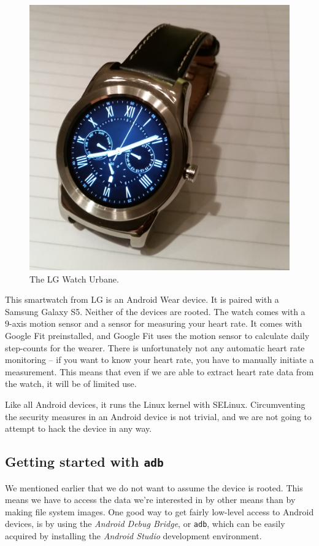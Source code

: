 \documentclass[a4paper,11pt,dvips]{article}
\begin{document}
\begin{figure}
\begin{center}
\includegraphics[natwidth=1000bp,natheight=1019bp,width=0.8\linewidth]{urbane}
\end{center}
\caption{The LG Watch Urbane.}
\label{fig:urbane}
\end{figure}

This smartwatch from LG is an Android Wear device. It is paired with a Samsung Galaxy S5. Neither of the devices are rooted. The watch comes with a 9-axis motion sensor and a sensor for measuring your heart rate. It comes with Google Fit preinstalled, and Google Fit uses the motion sensor to calculate daily step-counts for the wearer. There is unfortunately not any automatic heart rate monitoring -- if you want to know your heart rate, you have to manually initiate a measurement. This means that even if we are able to extract heart rate data from the watch, it will be of limited use.

Like all Android devices, it runs the Linux kernel with SELinux. Circumventing the security measures in an Android device is not trivial, and we are not going to attempt to hack the device in any way.


\subsection{Getting started with \texttt{adb}}

We mentioned earlier that we do not want to assume the device is rooted. This means we have to access the data we're interested in by other means than by making file system images. One good way to get fairly low-level access to Android devices, is by using the \textit{Android Debug Bridge}, or \texttt{adb}, which can be easily acquired by installing the \textit{Android Studio} development environment.
\end{document}
